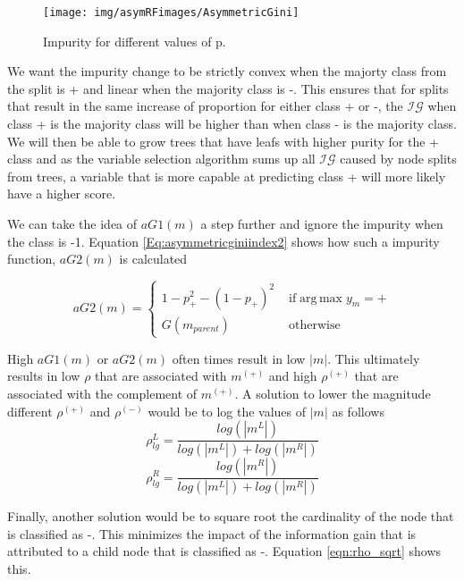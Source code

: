 \documentclass[twoside,11pt]{article}
\begin{document}
\begin{figure}
 \centering
\texttt{[image: img/asymRFimages/AsymmetricGini]}\\
 \caption{Impurity for different values of p.}
 \label{Fig:Quantile Regression}
\end{figure}

We want the impurity change to be strictly convex when the majorty class from the split is + and linear when the majority class is -. This ensures that for splits that result in the same increase of proportion for either class + or -, the $\mathcal{IG}$ when class + is the majority class will be higher than when class - is the majority class. We will then be able to grow trees that have leafs with higher purity for the + class and as the variable selection algorithm sums up all $\mathcal{IG}$ caused by node splits from trees, a variable that is more capable at predicting class + will more likely have a higher score. 

We can take the idea of $aG1(m)$ a step further and ignore the impurity when the class is -1. Equation \ref{Eq:asymmetricginiindex2} shows how such a impurity function, $aG2(m)$ is calculated

\begin{equation}\label{Eq:asymmetricginiindex2}
aG2(m)=
\begin{cases} 1-p_{+}^2-(1-p_{+})^2 & \text{ if} \operatorname{arg\,max} y_m = + 
\\ G(m_{parent})&\text{ otherwise}
\end{cases}
\end{equation}

High $aG1(m)$ or $aG2(m)$ often times result in low $|m|$. This ultimately results in low $\rho$ that are associated with $m^{(+)}$ and high $\rho^{(+)}$ that are associated with the complement of $m^{(+)}$. A solution to lower the magnitude different $\rho^{(+)}$  and $\rho^{(-)}$ would be to log the values of $|m|$ as follows
\begin{equation}\label{eqn:rho_log}
	\rho_{lg}^L = \frac{log(|m^L|)}{log(|m^L|)+log(|m^R|)}
\end{equation}
\begin{equation}
	\rho_{lg}^R = \frac{log(|m^R|)}{log(|m^L|)+log(|m^R|)}
\end{equation}


Finally, another solution would be to square root the cardinality of the node that is classified as -. This minimizes the impact of the information gain that is attributed to a child node that is classified as -. Equation \ref{eqn:rho_sqrt} shows this.
\end{document}
